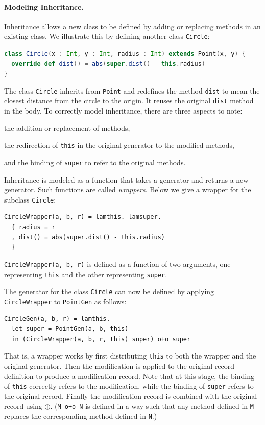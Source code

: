 \paragraph{Modeling Inheritance.}

Inheritance allows a new class to be defined by adding or replacing methods in
an existing class. We illustrate this by defining another class \lstinline{Circle}:
\begin{lstlisting}[language=Scala]
class Circle(x : Int, y : Int, radius : Int) extends Point(x, y) {
  override def dist() = abs(super.dist() - this.radius)
}
\end{lstlisting}
The class \lstinline{Circle} inherits from \lstinline{Point} and redefines the
method \lstinline{dist} to mean the closest distance from the circle to the
origin. It reuses the original \lstinline{dist} method in the body.
To correctly model inheritance, there are three aspects to note:
\begin{inparaenum}[(1)]
\item the addition or replacement of methods,
\item the redirection of \lstinline{this} in the original generator to the modified methods,
\item and the binding of \lstinline{super} to refer to the original methods.
\end{inparaenum}

Inheritance is modeled as a function that takes a generator and returns a new
generator. Such functions are called \emph{wrappers}. Below we give a wrapper
for the subclass \lstinline{Circle}:
\begin{lstlisting}[language=simple]
CircleWrapper(a, b, r) = lamthis. lamsuper.
  { radius = r
  , dist() = abs(super.dist() - this.radius)
  }
\end{lstlisting}
\lstinline{CircleWrapper(a, b, r)} is defined as a function of two arguments,
one representing \lstinline{this} and the other representing \lstinline{super}.

The generator for the class \lstinline{Circle} can now be defined by
applying \lstinline{CircleWrapper} to \lstinline{PointGen} as follows:
\begin{lstlisting}[language=simple]
CircleGen(a, b, r) = lamthis.
  let super = PointGen(a, b, this)
  in (CircleWrapper(a, b, r, this) super) o+o super
\end{lstlisting}
That is, a wrapper works by first distributing \lstinline{this} to both the
wrapper and the original generator. Then the modification is applied to the
original record definition to produce a modification record. Note that at this
stage, the binding of \lstinline{this} correctly refers to the modification,
while the binding of \lstinline{super} refers to the original record. Finally
the modification record is combined with the original record using $\oplus$.
(\lstinline{M o+o N} is defined in a way such that any method defined in \lstinline{M}
replaces the corresponding method defined in \lstinline{N}.)


